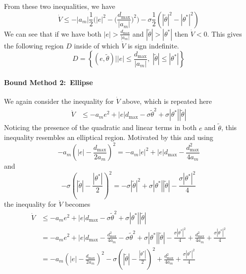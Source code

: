 From these two inequalities, we have
\begin{equation*}
  \dot{V}
  \leq
  -|a_{m}|\frac{1}{2}\biggr(|e|^{2}-\biggr(\frac{d_{\text{max}}}{|a_{m}|}\biggr)^{2}\biggr)
  -\sigma\frac{1}{2}\left(|\tilde{\theta}|^{2}-|\theta^{*}|^{2}\right)
\end{equation*}
We can see that if we have both $|e|>\frac{d_{\text{max}}}{|a_{m}|}$ and $|\tilde{\theta}|>|\theta^{*}|$ then $\dot{V}<0$.
This gives the following region $D$ inside of which $\dot{V}$ is sign indefinite.
\begin{equation*}
  D=\left\{(e,\tilde{\theta})\biggr||e|\leq\frac{d_{\text{max}}}{|a_{m}|},\;|\tilde{\theta}|\leq|\theta^{*}|\right\}
\end{equation*}

\paragraph{Bound Method 2:\ Ellipse}
We again consider the inequality for $\dot{V}$ above, which is repeated here
\begin{align*}
  \dot{V}
  &\leq
  -a_{m}e^{2}+|e|d_{\text{max}}-\sigma\tilde{\theta}^{2}+\sigma|\theta^{*}||\tilde{\theta}|
\end{align*}
Noticing the presence of the quadratic and linear terms in both $e$ and $\tilde{\theta}$, this inequality resembles an elliptical region.
Motivated by this and using
\begin{equation*}
  -a_{m}\left(|e|-\frac{d_{\text{max}}}{2a_{m}}\right)^{2}=
  -a_{m}|e|^{2}+|e|d_{\text{max}}-\frac{d_{\text{max}}^{2}}{4a_{m}}
\end{equation*}
and
\begin{equation*}
  -\sigma\left(|\tilde{\theta}|-\frac{|\theta^{*}|}{2}\right)^{2}=
  -\sigma|\tilde{\theta}|^{2}+\sigma|\theta^{*}||\tilde{\theta}|-\frac{\sigma|\theta^{*}|^{2}}{4}
\end{equation*}
the inequality for $\dot{V}$ becomes
\begin{align*}
  \dot{V}
  &\leq
  -a_{m}e^{2}+|e|d_{\text{max}}-\sigma\tilde{\theta}^{2}+\sigma|\theta^{*}||\tilde{\theta}| \\
  &=
  -a_{m}e^{2}+|e|d_{\text{max}}-\frac{d_{\text{max}}^{2}}{4a_{m}}-\sigma\tilde{\theta}^{2}+\sigma|\theta^{*}||\tilde{\theta}|-\frac{\sigma|\theta^{*}|^{2}}{4}+\frac{d_{\text{max}}^{2}}{4a_{m}}+\frac{\sigma|\theta^{*}|^{2}}{4} \\
  &=
  -a_{m}\left(|e|-\frac{d_{\text{max}}}{2a_{m}}\right)^{2}-\sigma\left(|\tilde{\theta}|-\frac{|\theta^{*}|}{2}\right)^{2}+\frac{d_{\text{max}}^{2}}{4a_{m}}+\frac{\sigma|\theta^{*}|^{2}}{4}
\end{align*}
